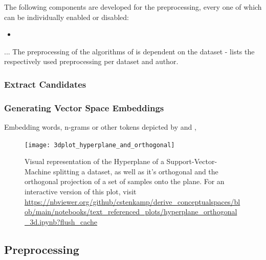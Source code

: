 The following components are developed for the preprocessing, every one of which can be individually enabled or disabled:
\begin{itemize}
	\item 
\end{itemize}



... The preprocessing of the algorithms of \mainalgos is dependent on the dataset -  lists the respectively used preprocessing per dataset and author.


\subsubsection{Extract Candidates}


\subsubsection{Generating Vector Space Embeddings}

Embedding words, n-grams or other tokens depicted by \cite{Turney2010} and \cite{Lowe}, 













\begin{figure}
	\begin{center}
	  \texttt{[image: 3dplot\_hyperplane\_and\_orthogonal]}
	  \caption[Visual representation of the Hyperplane of an SVM splitting a dataset]{ \label{fig:3d_hyperplane_ortho} Visual representation of the Hyperplane of a Support-Vector-Machine splitting a dataset, as well as it's orthogonal and the orthogonal projection of a set of samples onto the plane. For an interactive version of this plot, visit  {\small \url{https://nbviewer.org/github/cstenkamp/derive_conceptualspaces/blob/main/notebooks/text_referenced_plots/hyperplane_orthogonal_3d.ipynb?flush_cache}}}
	\end{center}
\end{figure}




\subsection{Preprocessing}

